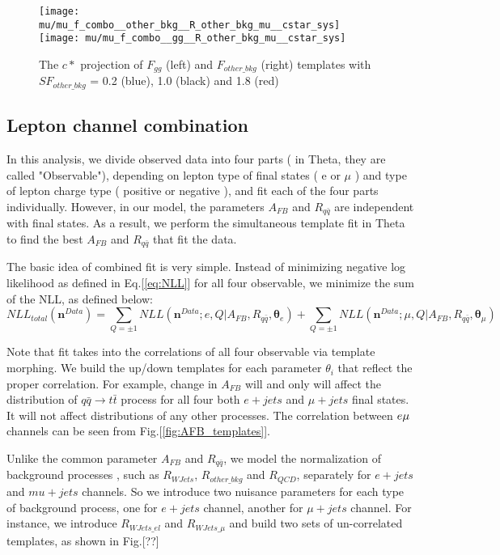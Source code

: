 \begin{figure}[hbt]
  \begin{center}
    \texttt{[image: mu/mu\_f\_combo\_\_other\_bkg\_\_R\_other\_bkg\_mu\_\_cstar\_sys]}
    \texttt{[image: mu/mu\_f\_combo\_\_gg\_\_R\_other\_bkg\_mu\_\_cstar\_sys]}

  \caption{\small The $c*$ projection of $F_{gg}$ (left) and $F_{other\_bkg}$ (right) templates with $SF_{other\_bkg}$ = 0.2 (blue), 1.0 (black) and 1.8 (red)}
    \label{fig:gg_SF_bkg_templates}
  \end{center}
\end{figure}


\subsection{Lepton channel combination} %
\label{sec:lepton combination}

In this analysis, we divide observed data into four parts ( in Theta, they are called "Observable"), depending on lepton type of final states ( e or $\mu$ ) and type of lepton charge type ( positive or negative ), and fit each of the four parts individually. However, in our model, the parameters $A_{FB}$ and $R_{q\bar{q}}$ are independent with final states. As a result, we perform the simultaneous template fit in Theta to find the best $A_{FB}$ and $R_{q\bar{q}}$ that fit the data. 

The basic idea of combined fit is very simple. Instead of minimizing negative log likelihood as defined in Eq.[\ref{eq:NLL}] for all four observable, we minimize the sum of the NLL, as defined below:
\begin{equation}
NLL_{total} (\bm n^{Data}) = \sum_{Q=\pm 1} NLL(\bm n^{Data};e, Q |A_{FB},R_{q\bar{q}},\bm \theta_{e}) +  \sum_{Q=\pm 1} NLL(\bm n^{Data};\mu, Q |A_{FB},R_{q\bar{q}},\bm \theta_{\mu})
\end{equation}

Note that fit takes into the correlations of all four observable via template morphing. We build the up/down templates for each parameter $\theta_i$ that reflect the proper correlation. For example, change in $A_{FB}$ will and only will affect the distribution of $q\bar{q}\rightarrow t\bar{t}$ process for all four both $e+jets$ and $\mu + jets$ final states. It will not affect distributions of any other processes. The correlation between $e\/\mu$ channels can be seen from Fig.[\ref{fig:AFB_templates}].

Unlike the common parameter $A_{FB}$ and $R_{q\bar{q}}$, we model the normalization of background processes , such as $R_{WJets}$, $R_{other\_bkg}$ and $R_{QCD}$, separately for $e+jets$ and $mu+jets$ channels. So we introduce two nuisance parameters for each type of background process, one for $e+jets$ channel, another for $\mu+jets$ channel. For instance, we introduce $R_{WJets\_el}$ and $R_{WJets\_\mu}$ and build two sets of un-correlated templates, as shown in Fig.[??]

